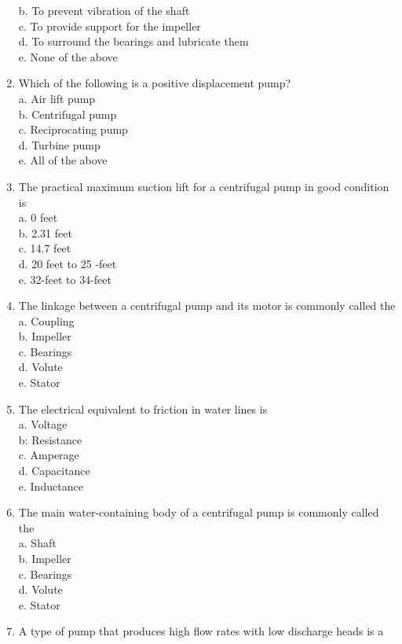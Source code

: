 \begin{enumerate}[1.]
b. To prevent vibration of the shaft\\
c. To provide support for the impeller\\
d. To surround the bearings and lubricate them\\
e. None of the above\\
\item Which of the following is a positive displacement pump?\\
a. Air lift pump\\
b. Centrifugal pump\\
c. Reciprocating pump\\
d. Turbine pump\\
e. All of the above\\
\item The practical maximum suction lift for a centrifugal pump in good condition is\\
a. 0 feet\\
b. 2.31 feet\\
c. 14.7 feet\\
d. 20 feet to 25 -feet\\
e. 32-feet to 34-feet\\
\item The linkage between a centrifugal pump and its motor is commonly called the\\
a. Coupling\\
b. Impeller\\
c. Bearings\\
d. Volute\\
e. Stator\\
\item The electrical equivalent to friction in water lines is\\
a. Voltage\\
b: Resistance\\
c. Amperage\\
d. Capacitance\\
e. Inductance\\
\item The main water-containing body of a centrifugal pump is commonly called the\\
a. Shaft\\
b. Impeller\\
c. Bearings\\
d. Volute\\
e. Stator\\
\item A type of pump that produces high flow rates with low discharge heads is a\\

\end{enumerate}
